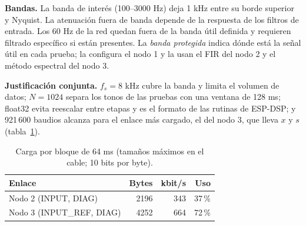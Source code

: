 \documentclass[10pt,a4paper,twocolumn]{article}
\begin{document}
\textbf{Bandas.} La banda de interés (100--3000 Hz) deja 1 kHz entre su borde superior y Nyquist. La atenuación fuera de banda depende de la respuesta de los filtros de entrada. Los 60 Hz de la red quedan fuera de la banda útil definida y requieren filtrado específico si están presentes. La \emph{banda protegida} indica dónde está la señal útil en cada prueba; la configura el nodo 1 y la usan el FIR del nodo 2 y el método espectral del nodo 3.

\textbf{Justificación conjunta.} $f_s = 8$ kHz cubre la banda y limita el volumen de datos; $N = 1024$ separa los tonos de las pruebas con una ventana de 128 ms; float32 evita reescalar entre etapas y es el formato de las rutinas de ESP-DSP\cite{espdsp}; y 921\,600 baudios alcanza para el enlace más cargado, el del nodo 3, que lleva $x$ y $s$ (tabla~\ref{tab:enlaces}).
\begin{table}[!t]\centering\caption{Carga por bloque de 64 ms (tamaños máximos en el cable; 10 bits por byte).}\label{tab:enlaces}\small\setlength{\tabcolsep}{4pt}
\begin{tabular}{lrrr}\toprule Enlace & Bytes & kbit/s & Uso\\\midrule
Nodo 2 (INPUT, DIAG) & 2196 & 343 & 37\,\%\\
Nodo 3 (INPUT\_REF, DIAG) & 4252 & 664 & 72\,\%\\\bottomrule\end{tabular}\end{table}
\end{document}
